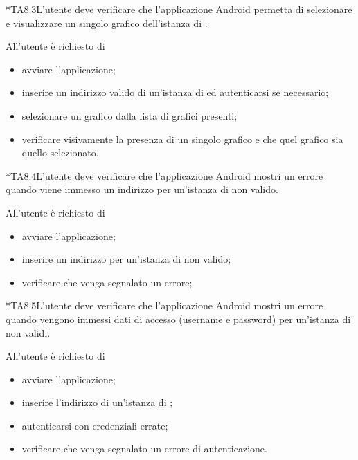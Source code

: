 	*{TA8.3}L'utente deve verificare che l'applicazione Android permetta di selezionare e visualizzare un singolo grafico dell'istanza di \projectname{}.

		All'utente è richiesto di
		\begin{itemize}
			\item avviare l'applicazione;
			\item inserire un indirizzo valido di un'istanza di \projectname{} ed autenticarsi se necessario;
			\item selezionare un grafico dalla lista di grafici presenti;
			\item verificare visivamente la presenza di un singolo grafico e che quel grafico sia quello selezionato.
		\end{itemize}

	*{TA8.4}L'utente deve verificare che l'applicazione Android mostri un errore quando viene immesso un indirizzo per un'istanza di \projectname{} non valido.

		All'utente è richiesto di
		\begin{itemize}
			\item avviare l'applicazione;
			\item inserire un indirizzo per un'istanza di \projectname{} non valido;
			\item verificare che venga segnalato un errore;
		\end{itemize}

	*{TA8.5}L'utente deve verificare che l'applicazione Android mostri un errore quando vengono immessi dati di accesso (username e password) per un'istanza di \projectname{} non validi.

		All'utente è richiesto di
		\begin{itemize}
			\item avviare l'applicazione;
			\item inserire l'indirizzo di un'istanza di \projectname{};
			\item autenticarsi con credenziali errate;
			\item verificare che venga segnalato un errore di autenticazione.
		\end{itemize}